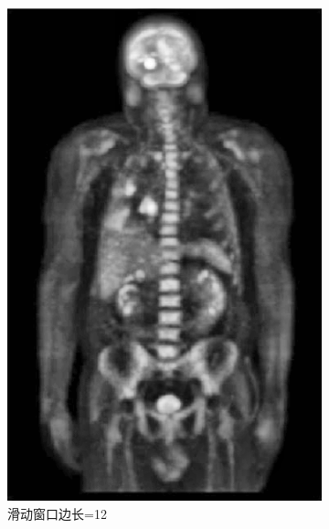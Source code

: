 \documentclass[a4paper]{ctexart}
\newcommand{\outwfour}{0.23\textwidth}
\begin{document}
\begin{spacing}{1.35}
\begin{figure}[htbp]
\begin{subfigure}[t]{\outwfour}
			\includegraphics[width=\textwidth]{figure/2_tile_grid_size_12.png}
			\caption{滑动窗口边长=12}
		\end{subfigure}
		\begin{subfigure}[t]{\outwfour}
			\centering

\end{subfigure}
\end{figure}
\end{spacing}
\end{document}
